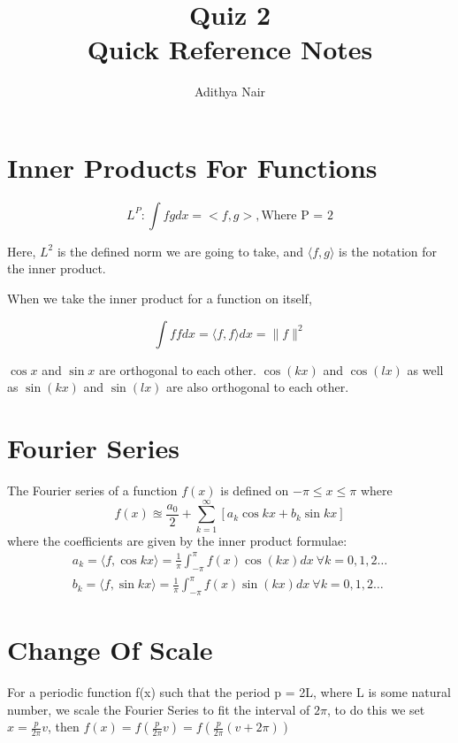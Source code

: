 \documentclass{article}
\title{\Huge{Quiz 2}\\ Quick Reference Notes}
\author{\huge{Adithya Nair}}
\date{}
\begin{document}
\section{Inner Products For Functions} %
\[L^P: \int f g dx = <f,g>, \text{Where P = 2}\]

Here, $L^2$ is the defined norm we are going to take, and $\langle f,g\rangle$ is the notation for the inner product.

When we take the inner product for a function on itself,

\[\int f f dx = \langle f,f\rangle dx = \|f\|^2\]

\begin{note}
   $\cos{x}$ and $\sin{x}$ are orthogonal to each other. $\cos{(kx)}$ and $\cos{(lx)}$ as well as $\sin{(kx)}$ and $\sin{(lx)}$ are also orthogonal to each other.
\end{note}



\section{Fourier Series}
\begin{definition}
   The Fourier series of a function $f(x)$ is defined on $-\pi \leq x \leq \pi$ where    \[
   	 f(x) \approxeq \frac{a_0}{2}+\sum_{k=1}^{\infty}[a_k \cos{kx} + b_k \sin{kx}]
   \]
   where the coefficients are given by the inner product formulae:
   \begin{align*}
      a_k = \langle f, \cos{kx} \rangle = \frac{1}{\pi}\int_{-\pi}^{\pi} f(x) \cos{(kx)} dx \ \forall k = 0,1,2\dots \\
      b_k = \langle f, \sin{kx} \rangle = \frac{1}{\pi}\int_{-\pi}^{\pi} f(x) \sin{(kx)} dx \ \forall k = 0,1,2\dots
   \end{align*}
\end{definition}

\section{Change Of Scale} %
For a periodic function f(x) such that the period p = 2L, where L is some natural number, we scale the Fourier Series to fit the interval of $2\pi$, to do this we set $x = \frac{p}{2\pi}v$, then $f(x) = f(\frac{p}{2\pi}v) = f(\frac{p}{2\pi}(v+2\pi))$
\end{document}
